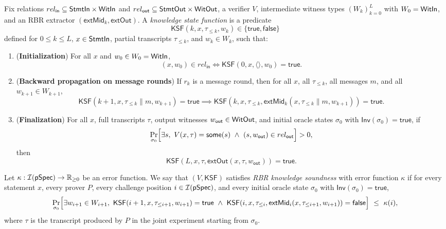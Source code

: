 \begin{definition}
Fix relations $rel_{\mathsf{in}} \subseteq \mathsf{StmtIn}\times\mathsf{WitIn}$ and $rel_{\mathsf{out}} \subseteq
\mathsf{StmtOut}\times\mathsf{WitOut}$, a verifier $V$, intermediate witness types $(W_k)_{k=0}^L$ with $W_0=\mathsf{WitIn}$,
and an RBR extractor $(\mathsf{extMid}_k,\mathsf{extOut})$. A \emph{knowledge state function} is a
predicate
\[
  \mathsf{KSF}(k,x,\tau_{\le k},w_k) \in \{\mathsf{true},\mathsf{false}\}
\]
defined for $0 \le k \le L$, $x\in\mathsf{StmtIn}$, partial transcripts $\tau_{\le k}$, and
$w_k \in W_k$, such that:
\begin{enumerate}
  \item (\textbf{Initialization}) For all $x$ and $w_0 \in W_0=\mathsf{WitIn}$,
  \[
    (x,w_0) \in rel_{\mathsf{in}} \iff \mathsf{KSF}(0,x,\langle\rangle,w_0)=\mathsf{true}.
  \]
  \item (\textbf{Backward propagation on message rounds}) If $r_k$ is a message round, then for all
  $x$, all $\tau_{\le k}$, all messages $m$, and all $w_{k+1}\in W_{k+1}$,
  \[
    \mathsf{KSF}(k+1,x,\tau_{\le k}\mathbin{\|}m,w_{k+1})=\mathsf{true}
    \implies
    \mathsf{KSF}(k,x,\tau_{\le k},\mathsf{extMid}_k(x,\tau_{\le k}\mathbin{\|}m,w_{k+1}))=\mathsf{true}.
  \]
  \item (\textbf{Finalization}) For all $x$, full transcripts $\tau$, output witnesses
  $w_{\mathsf{out}}\in\mathsf{WitOut}$, and initial oracle states $\sigma_0$ with
  $\mathsf{Inv}(\sigma_0)=\mathsf{true}$, if
  \[
    \Pr_{\sigma_0}\Bigl[\exists s,\ V(x,\tau) = \mathsf{some}(s)\ \wedge\ (s,w_{\mathsf{out}})\in rel_{\mathsf{out}}\Bigr] > 0,
  \]
  then
  \[
    \mathsf{KSF}(L,x,\tau,\mathsf{extOut}(x,\tau,w_{\mathsf{out}}))=\mathsf{true}.
  \]
\end{enumerate}
\end{definition}

\begin{definition}
Let $\kappa : \mathcal{I}(\mathsf{pSpec})\to \mathbb{R}_{\ge 0}$ be an error function. We say that $(V,
\mathsf{KSF})$ satisfies \emph{RBR knowledge soundness} with error function $\kappa$ if for every
statement $x$, every prover $P$, every challenge position $i \in \mathcal{I}(\mathsf{pSpec})$, and every
initial oracle state $\sigma_0$ with $\mathsf{Inv}(\sigma_0)=\mathsf{true}$,
\[
  \Pr_{\sigma_0}\Bigl[
    \exists w_{i+1}\in W_{i+1},\
    \mathsf{KSF}(i+1,x,\tau_{\le i+1},w_{i+1})=\mathsf{true}
    \ \wedge\
    \mathsf{KSF}(i,x,\tau_{\le i},\mathsf{extMid}_i(x,\tau_{\le i+1},w_{i+1}))=\mathsf{false}
  \Bigr]
  \ \le\ \kappa(i),
\]
where $\tau$ is the transcript produced by $P$ in the joint experiment starting from $\sigma_0$.
\end{definition}

